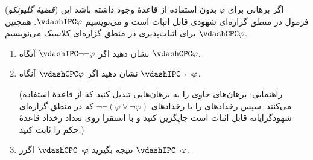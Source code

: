 (\emph{قضیهٔ گلیونکو})
اگر برهانی برای $\varphi$ بدون استفاده از قاعدهٔ  وجود داشته باشد این فرمول در منطق گزاره‌ای شهودی قابل اثبات است و می‌نویسیم $\vdashIPC\varphi$. همچنین برای اثبات‌پذیری در منطق گزاره‌ای کلاسیک می‌نویسیم $\vdashCPC\varphi$.
\begin{enumerate}[label=(\alph*)]
        \item 
    نشان دهید اگر
    $\vdashIPC\neg\neg\varphi$
    آنگاه
    $\vdashCPC\varphi$.
    \item 
    نشان دهید اگر
    $\vdashCPC\varphi$
    آنگاه
    $\vdashIPC\neg\neg\varphi$.

    (راهنمایی: برهان‌های حاوی
    را به برهان‌هایی تبدیل کنید که از قاعدهٔ
    استفاده می‌کنند. سپس رخدادهای
    را با رخدادهای
    $\neg\neg(\varphi\vee\neg\varphi)$
    که در منطق گزاره‌ای شهودگرایانه قابل اثبات است جایگزین کنید و با استقرا روی تعداد رخداد قاعدهٔ
    حکم را ثابت کنید.)
    \item نتیجه بگیرید
    $\vdashCPC\neg\varphi$ اگرر $\vdashIPC\neg\varphi$.
\end{enumerate}\quad
